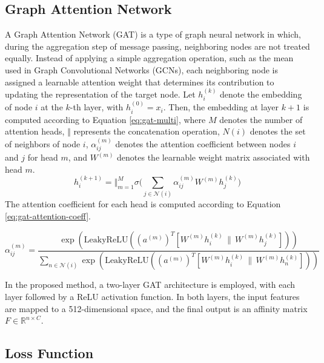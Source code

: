 \subsection{Graph Attention Network}
A Graph Attention Network (GAT) is a type of graph neural network in which, during the aggregation step of message passing, neighboring nodes are not treated equally. Instead of applying a simple aggregation operation, such as the mean used in Graph Convolutional Networks (GCNs), each neighboring node is assigned a learnable attention weight that determines its contribution to updating the representation of the target node. Let \(h_i^{(k)}\) denote the embedding of node \(i\) at the \(k\)-th layer, with \(h_i^{(0)} = x_i\). Then, the embedding at layer \(k+1\) is computed according to Equation \ref{eq:gat-multi}, where \(M\) denotes the number of attention heads, \(\Vert\) represents the concatenation operation, \(N(i)\) denotes the set of neighbors of node \(i\), \(\alpha_{ij}^{(m)}\) denotes the attention coefficient between nodes \(i\) and \(j\) for head \(m\), and \(W^{(m)}\) denotes the learnable weight matrix associated with head \(m\).
\begin{equation}
	h_i^{(k+1)} = \big\Vert_{m=1}^M \sigma\Big(\sum_{j \in \mathcal{N}(i)} \alpha_{ij}^{(m)} W^{(m)} h_j^{(k)} \Big)
	\label{eq:gat-multi}
\end{equation}
The attention coefficient for each head is computed according to Equation \ref{eq:gat-attention-coeff}.

\begin{equation}
	\alpha_{ij}^{(m)} =
	\frac{
		\exp\left(
		\mathrm{LeakyReLU}\left(
		\left(a^{(m)}\right)^T
		\left[
		W^{(m)}h_i^{(k)} \,\|\, W^{(m)}h_j^{(k)}
		\right]
		\right)
		\right)
	}{
		\sum_{n \in \mathcal{N}(i)}
		\exp\left(
		\mathrm{LeakyReLU}\left(
		\left(a^{(m)}\right)^T
		\left[
		W^{(m)}h_i^{(k)} \,\|\, W^{(m)}h_n^{(k)}
		\right]
		\right)
		\right)
	}
	\label{eq:gat-attention-coeff}
\end{equation}




In the proposed method, a two-layer GAT architecture is employed, with each layer followed by a ReLU activation function. In both layers, the input features are mapped to a 512-dimensional space, and the final output is an affinity matrix \(F \in \mathbb{R}^{n \times C}\).
\subsection{Loss Function}

